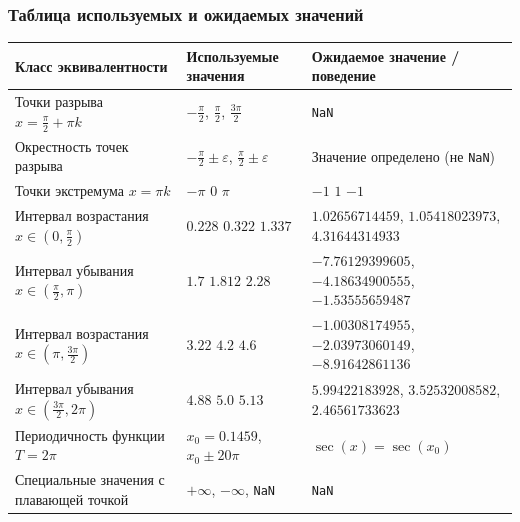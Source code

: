 \documentclass[12pt,a4paper]{report}
\begin{document}
\subsubsection*{Таблица используемых и ожидаемых значений}
\begin{center}
\begin{tabular}{|p{5.2cm}|p{5.0cm}|p{5.2cm}|}
\hline
\textbf{Класс эквивалентности} & \textbf{Используемые значения} & \textbf{Ожидаемое значение / поведение} \\
\hline
Точки разрыва $x=\frac{\pi}{2}+\pi k$ & $-\frac{\pi}{2}$, $\frac{\pi}{2}$, $\frac{3\pi}{2}$ & \texttt{NaN} \\
\hline
Окрестность точек разрыва & $-\frac{\pi}{2}\pm\varepsilon$, $\frac{\pi}{2}\pm\varepsilon$ & Значение определено (не \texttt{NaN}) \\
\hline
Точки экстремума $x=\pi k$ & $-\pi$ \break $0$ \break $\pi$ & $-1$ \break $1$ \break $-1$ \\
\hline
Интервал возрастания $x\in(0,\frac{\pi}{2})$ & $0.228$ \break $0.322$ \break $1.337$ & $1.02656714459$, $1.05418023973$, $4.31644314933$ \\
\hline
Интервал убывания $x\in(\frac{\pi}{2},\pi)$ & $1.7$ \break $1.812$ \break $2.28$ & $-7.76129399605$, $-4.18634900555$, $-1.53555659487$ \\
\hline
Интервал возрастания $x\in(\pi,\frac{3\pi}{2})$ & $3.22$ \break $4.2$ \break $4.6$ & $-1.00308174955$, $-2.03973060149$, $-8.91642861136$ \\
\hline
Интервал убывания $x\in(\frac{3\pi}{2},2\pi)$ & $4.88$ \break $5.0$ \break $5.13$ & $5.99422183928$, $3.52532008582$, $2.46561733623$ \\
\hline
Периодичность функции $T=2\pi$ & $x_0=0.1459$, $x_0\pm20\pi$ & $\sec(x)=\sec(x_0)$ \\
\hline
Специальные значения с плавающей точкой & $+\infty$, $-\infty$, \texttt{NaN} & \texttt{NaN} \\
\hline
\end{tabular}
\end{center}
\end{document}
